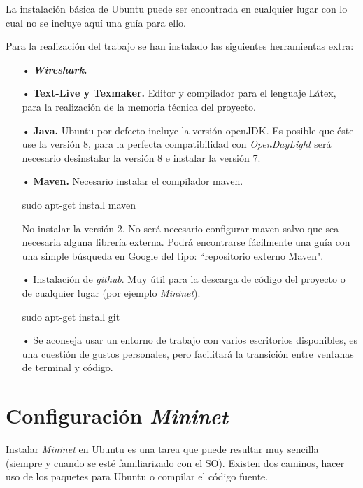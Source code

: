 \documentclass[a4paper,11pt]{book}
\begin{document}
La instalación básica de Ubuntu puede ser encontrada en cualquier lugar con lo cual no se incluye aquí una guía para ello.

Para la realización del trabajo se han instalado las siguientes herramientas extra:
\begin{itemize}
\item[•] \textbf{\emph{Wireshark}.}
\item[•] \textbf{Text-Live y Texmaker.} Editor y compilador para el lenguaje Látex, para la realización de la memoria técnica del proyecto.
\item[•] \textbf{Java.} Ubuntu por defecto incluye la versión openJDK. Es posible que éste use la versión 8, para la perfecta compatibilidad con \emph{OpenDayLight} será necesario desinstalar la versión 8 e instalar la versión 7.
\item[•] \textbf{Maven.} Necesario instalar el compilador maven.

\begin{python}
sudo apt-get install maven
\end{python}

No instalar la versión 2. No será necesario configurar maven salvo que sea necesaria alguna librería externa. Podrá encontrarse fácilmente una guía con una simple búsqueda en Google del tipo: ``repositorio externo Maven".

\item[•] Instalación de \textit{github}. Muy útil para la descarga de código del proyecto o de cualquier lugar (por ejemplo \emph{Mininet}).

\begin{python}
sudo apt-get install git
\end{python}

\item[•] Se aconseja usar un entorno de trabajo con varios escritorios disponibles, es una cuestión de gustos personales, pero facilitará la transición entre ventanas de terminal y código.
\end{itemize}

\newpage
\section{Configuración \emph{Mininet}}\label{configMininet}
Instalar \emph{Mininet} en Ubuntu es una tarea que puede resultar muy sencilla (siempre y cuando se esté familiarizado con el \ac{SO}). Existen dos caminos, hacer uso de los paquetes para Ubuntu o compilar el código fuente.
\end{document}
